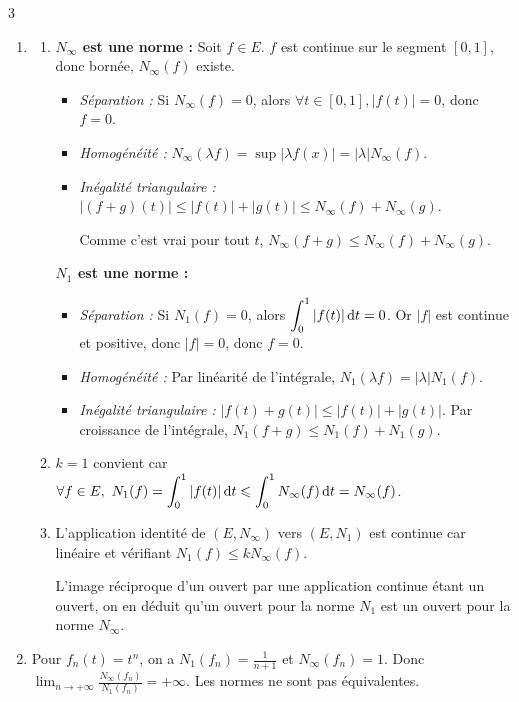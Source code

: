 \begin{correction}{3}
\begin{enumerate}
    \item 
    \begin{enumerate}
        \item
        
        \textbf{$N_\infty$ est une norme :}
        Soit $f \in E$. $f$ est continue sur le segment $[0,1]$,
        donc bornée, $N_\infty(f)$ existe.
        \begin{itemize}
            \item \textit{Séparation :} Si $N_\infty(f) = 0$, alors $\forall t \in [0,1], |f(t)| = 0$, donc $f=0$.
            \item \textit{Homogénéité :} $N_\infty(\lambda f) = \sup |\lambda f(x)| = |\lambda| N_\infty(f)$.
            \item \textit{Inégalité triangulaire :} $|(f+g)(t)| \leqslant |f(t)| + |g(t)| \leqslant N_\infty(f) + N_\infty(g)$.
            
            Comme c'est vrai pour tout $t$, $N_\infty(f+g) \leqslant N_\infty(f) + N_\infty(g)$.
        \end{itemize}

        \textbf{$N_1$ est une norme :}
        \begin{itemize}
            \item \textit{Séparation :} Si $N_1(f) = 0$, alors $\displaystyle \int_0^1 |f(t)| \,\mathrm{d}t = 0$. Or $|f|$ est continue et positive, donc $|f|=0$, donc $f=0$.
            \item \textit{Homogénéité :} Par linéarité de l'intégrale, $N_1(\lambda f) = |\lambda| N_1(f)$.
            \item \textit{Inégalité triangulaire :} $|f(t)+g(t)| \leqslant |f(t)| + |g(t)|$. Par croissance de l'intégrale, $N_1(f+g) \leqslant N_1(f) + N_1(g)$.
        \end{itemize}

        \item $k=1$ convient car $\displaystyle \forall f \in E,~N_1(f) = \int_0^1 |f(t)| \,\mathrm{d}t \leqslant \int_0^1 N_\infty(f) \,\mathrm{d}t = N_\infty(f)$.

        \item L'application identité de $(E, N_\infty)$ vers $(E, N_1)$ est continue car linéaire et vérifiant $N_1(f) \leqslant k N_\infty(f)$.

        L'image réciproque d'un ouvert par une application continue étant un ouvert, on en déduit qu'un ouvert pour la norme $N_1$ est un ouvert pour la norme $N_\infty$.     
    \end{enumerate}

    \item
    Pour $f_n(t) = t^n$, on a $N_1(f_n) = \frac{1}{n+1}$ et $N_\infty(f_n) = 1$.
    Donc $\lim_{n \to +\infty} \frac{N_\infty(f_n)}{N_1(f_n)} = +\infty$. Les normes ne sont pas équivalentes.
\end{enumerate}
\end{correction}


